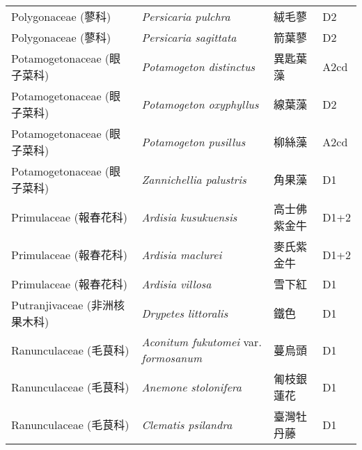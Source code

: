 \begin{longtable}{p{3cm}p{5cm}p{3cm}p{4cm}}
    Polygonaceae (蓼科) & \textit{Persicaria pulchra}  & 絨毛蓼 & D2 \index{Persicaria@\textit{Persicaria}!pulchra@\textit{pulchra}}  \index{絨毛蓼} \\
    Polygonaceae (蓼科) & \textit{Persicaria sagittata}  & 箭葉蓼 & D2 \index{Persicaria@\textit{Persicaria}!sagittata@\textit{sagittata}}  \index{箭葉蓼} \\
    Potamogetonaceae (眼子菜科) & \textit{Potamogeton distinctus}  & 異匙葉藻 & A2cd \index{Potamogeton@\textit{Potamogeton}!distinctus@\textit{distinctus}}  \index{異匙葉藻} \\
    Potamogetonaceae (眼子菜科) & \textit{Potamogeton oxyphyllus}  & 線葉藻 & D2 \index{Potamogeton@\textit{Potamogeton}!oxyphyllus@\textit{oxyphyllus}}  \index{線葉藻} \\
    Potamogetonaceae (眼子菜科) & \textit{Potamogeton pusillus}  & 柳絲藻 & A2cd \index{Potamogeton@\textit{Potamogeton}!pusillus@\textit{pusillus}}  \index{柳絲藻} \\
    Potamogetonaceae (眼子菜科) & \textit{Zannichellia palustris}  & 角果藻 & D1 \index{Zannichellia@\textit{Zannichellia}!palustris@\textit{palustris}}  \index{角果藻} \\
    Primulaceae (報春花科) & \textit{Ardisia kusukuensis}  & 高士佛紫金牛 & D1+2 \index{Ardisia@\textit{Ardisia}!kusukuensis@\textit{kusukuensis}}  \index{高士佛紫金牛} \\
    Primulaceae (報春花科) & \textit{Ardisia maclurei}  & 麥氏紫金牛 & D1+2 \index{Ardisia@\textit{Ardisia}!maclurei@\textit{maclurei}}  \index{麥氏紫金牛} \\
    Primulaceae (報春花科) & \textit{Ardisia villosa}  & 雪下紅 & D1 \index{Ardisia@\textit{Ardisia}!villosa@\textit{villosa}}  \index{雪下紅} \\
    Putranjivaceae (非洲核果木科) & \textit{Drypetes littoralis}  & 鐵色 & D1 \index{Drypetes@\textit{Drypetes}!littoralis@\textit{littoralis}}  \index{鐵色} \\
    Ranunculaceae (毛茛科) & \textit{Aconitum fukutomei} var. \textit{formosanum}  & 蔓烏頭 & D1 \index{Aconitum@\textit{Aconitum}!fukutomei@\textit{fukutomei}!var. formosanum@var. \textit{formosanum}}  \index{蔓烏頭} \\
    Ranunculaceae (毛茛科) & \textit{Anemone stolonifera}  & 匍枝銀蓮花 & D1 \index{Anemone@\textit{Anemone}!stolonifera@\textit{stolonifera}}  \index{匍枝銀蓮花} \\
    Ranunculaceae (毛茛科) & \textit{Clematis psilandra}  & 臺灣牡丹藤 & D1 \index{Clematis@\textit{Clematis}!psilandra@\textit{psilandra}}  \index{臺灣牡丹藤} \\

\end{longtable}

